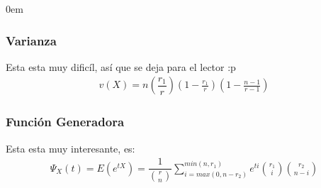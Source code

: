 \documentclass[12pt, fleqn]{report}                             %
\newenvironment{SmallIndentation}[1][0.75em]                    %
        {\begin{adjustwidth}{#1}{}\begin{footnotesize}}             %
        {\end{footnotesize}\end{adjustwidth}}                       %
\theoremstyle{break}                                            %
\newcommand{\Wrap}[1]{\left( #1 \right)}                        %
\newcommand{\pfrac}[2]{\Wrap{\dfrac{#1}{#2}}}                   %
\begin{document}
\begin{multicols}{2}
\begin{SmallIndentation}[0em]
                    \subsubsection{Varianza}

                        Esta esta muy dificíl, así que se deja para el lector :p
                        \begin{align*}
                            v(X) = n \pfrac{r_1}{r} \Wrap{1 - \frac{r_1}{r}} \Wrap{1 - \frac{n - 1}{r - 1}}
                        \end{align*}
                            

                        

                    \subsubsection{Función Generadora}

                        Esta esta muy interesante, es:
                        \begin{align*}
                            \Psi_X(t) 
                                = E( e^{tX} )                 
                                = \dfrac{1}{\binom{r}{n}}                      
                                    \sum_{i = max (0, n - r_2)}^{min(n, r_1)}               
                                       e^{ti} \binom{r_1}{i} \binom{r_2}{n - i}
                        \end{align*}

                \end{SmallIndentation}
                \end{multicols}
\end{document}
